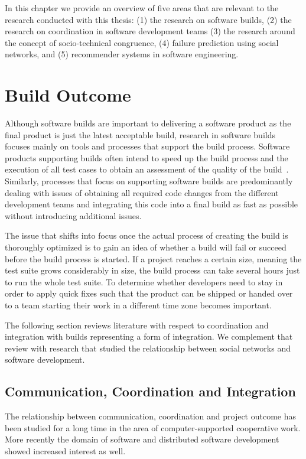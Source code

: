 \label{chap:bg}
In this chapter we provide an overview of five areas that are relevant to the research conducted with this thesis: (1) the research on software builds, (2) the research on coordination in software development teams (3) the research around the concept of socio-technical congruence, (4) failure prediction using social networks, and (5) recommender systems in software engineering.

\section{Build Outcome}
\label{sec:RelatedCommunication}
Although software builds are important to delivering a software product as the final product is just the latest acceptable build, research in software builds focuses mainly on tools and processes that support the build process.
Software products supporting builds often intend to speed up the build process and the execution of all test cases to obtain an assessment of the quality of the build~\cite{maraia:book:2005}.
Similarly, processes that focus on supporting software builds are predominantly dealing with issues of obtaining all required code changes from the different development teams and integrating this code into a final build as fast as possible without introducing additional issues.

The issue that shifts into focus once the actual process of creating the build is thoroughly optimized is to gain an idea of whether a build will fail or succeed before the build process is started.
If a project reaches a certain size, meaning the test suite grows considerably in size, the build process can take several hours just to run the whole test suite.
To determine whether developers need to stay in order to apply quick fixes such that the product can be shipped or handed over to a team starting their work in a different time zone becomes important.

The following section reviews literature with respect to coordination and integration with builds representing a form of integration.
We complement that review with research that studied the relationship between social networks and software development.

\subsection{Communication, Coordination and Integration}
The relationship between communication, coordination and project outcome has been
studied for a long time in the area of computer-supported cooperative work. More
recently the domain of software and distributed software development showed
increased interest as well.

